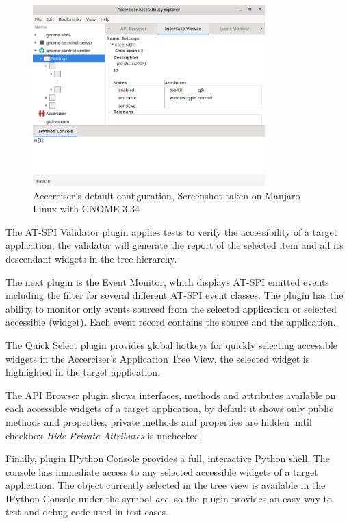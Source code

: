 \begin{figure}[H]
	\centering
	\includegraphics[width=0.8\textwidth]{obrazky-figures/accerciser.png}
	\caption{Accerciser's default configuration, Screenshot taken on Manjaro Linux with GNOME 3.34}
	\label{Accerciser_img}
\end{figure}


The AT-SPI Validator plugin applies tests to verify the accessibility of a target application, the validator will generate the report of the selected item and all its descendant widgets in the tree hierarchy.

The next plugin is the Event Monitor, which displays AT-SPI emitted events including the filter for several different AT-SPI event classes. The plugin has the ability to monitor only events sourced from the selected application or selected accessible (widget). Each event record contains the source and the application.

The Quick Select plugin provides global hotkeys for quickly selecting accessible widgets in the Accerciser's Application Tree View, the selected widget is highlighted in the target application.

The API Browser plugin shows interfaces, methods and attributes available on each accessible widgets of a target application, by default it shows only public methods and properties, private methods and properties are hidden until checkbox \textit{Hide Private Attributes} is unchecked.
 
Finally, plugin IPython Console provides a full, interactive Python shell. The console has immediate access to any selected accessible widgets of a target application. The object currently selected in the tree view is available in the IPython Console under the symbol \textit{acc}, so the plugin provides an easy way to test and debug code used in test cases.    

